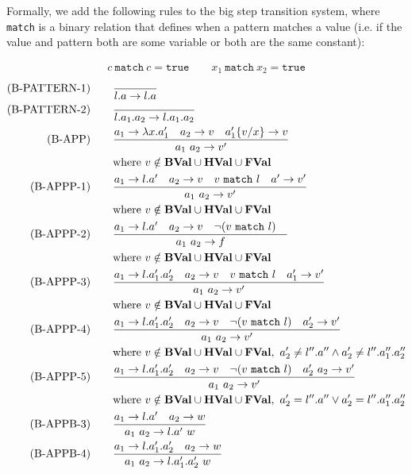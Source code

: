 \documentclass[10pt,a4paper,english]{article}
\begin{document}
Formally, we add the following rules to the big step transition system, where \texttt{match} is a binary relation that defines when a pattern matches a value (i.e. if the value and pattern both are some variable or both are the same constant):

\begin{align}
  c~\texttt{match}~c=\texttt{true}\qquad x_1~\texttt{match}~x_2=\texttt{true}
\end{align}
\begin{align}
(\text{B-PATTERN-1})\qquad
&\frac{}{l.a \to l.a}\\
(\text{B-PATTERN-2})\qquad
&\frac{}{l.a_1.a_2 \to l.a_1.a_2}\\
\text{(B-APP)}\qquad
&\frac{a_1\to\abs{x}{a_1'}\quad a_2\to v\quad a'_1\{v/x\}\to v}{\app{a_1}{a_2}\to v'}\\
&\text{where}~v\notin\bval\cup\hval\cup\textbf{FVal}\\
(\text{B-APPP-1})\qquad
&\frac{a_1 \to l.a'\quad a_2 \to v\quad v~\texttt{match}~l\quad a' \to v'}{\app{a_1}{a_2} \to v'}\\
&\text{where}~v\notin\bval\cup\hval\cup\textbf{FVal}\\
(\text{B-APPP-2})\qquad
&\frac{a_1 \to l.a'\quad a_2 \to v\quad \neg(v~\texttt{match}~l)\quad}{\app{a_1}{a_2} \to f}\\
&\text{where}~v\notin\bval\cup\hval\cup\textbf{FVal}\\
(\text{B-APPP-3})\qquad
&\frac{a_1\to l.a'_1.a'_2\quad a_2\to v \quad v~\texttt{match}~l\quad a'_1\to v'}{\app{a_1}{a_2} \to v'}\\
&\text{where}~v\notin\bval\cup\hval\cup\textbf{FVal}\\
(\text{B-APPP-4})\qquad
&\frac{a_1\to l.a'_1.a'_2\quad a_2\to v \quad \neg(v~\texttt{match}~l)\quad a'_2\to v'}{\app{a_1}{a_2} \to v'}\\
&\text{where}~v\notin\bval\cup\hval\cup\textbf{FVal},~a'_2\neq l''.a''\land a'_2\neq l''.a_1''.a_2''\\
(\text{B-APPP-5})\qquad
&\frac{a_1\to l.a'_1.a'_2\quad a_2\to v \quad \neg(v~\texttt{match}~l)\quad \app{a'_2}{a_2}\to v'}{\app{a_1}{a_2} \to v'}\\
&\text{where}~v\notin\bval\cup\hval\cup\textbf{FVal},~a'_2= l''.a''\lor a'_2= l''.a_1''.a_2''\\
(\text{B-APPB-3})\qquad
&\frac{a_1\to l.a'\quad a_2\to w}{\app{a_1}{a_2} \to \app{l.a'}{w}}\\
(\text{B-APPB-4})\qquad
&\frac{a_1\to l.a_1'.a_2'\quad a_2\to w}{\app{a_1}{a_2} \to \app{l.a_1'.a_2'}{w}}\\

\end{align}
\end{document}
